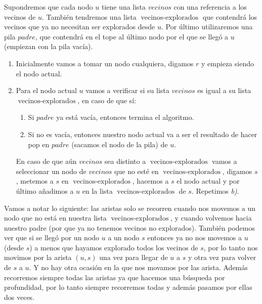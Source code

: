 \documentclass[11pt,letterpaper]{article}
\begin{document}
\begin{enumerate}[leftmargin=*]
    Supondremos que cada nodo $u$ tiene una lista $vecinos$ con una referencia a los vecinos de $u$.
    También tendremos una lista $\operatorname{vecinos-explorados}$ que contendrá los vecinos que ya no necesitan ser explorados desde $u$.
    Por último utilizaremos una pila $padre$, que contendrá en el tope al último nodo por el que se llegó a $u$ (empiezan con la pila vacía).

    \begin{enumerate}
      \item Inicialmente vamos a tomar un nodo cualquiera, digamos $r$ y empieza siendo el nodo actual.
    
      \item Para el nodo actual $u$ vamos a verificar si su lista $vecinos$ es igual a su lista $\operatorname{vecinos-explorados}$, en caso de que sí:
      \begin{enumerate}[label=\alph*)]
        \item Si $padre$ ya está vacía, entonces termina el algoritmo. 
        \item Si no es vacía, entonces nuestro nodo actual va a ser el resultado de hacer pop en $padre$ (sacamos el nodo de la pila) de $u$.
      \end{enumerate}

      En caso de que aún $vecinos$ sea distinto a $\operatorname{vecinos-explorados}$ vamos a seleccionar un nodo de $vecinos$ que no esté en $\operatorname{vecinos-explorados}$, digamos $s$, metemos a $s$ en $\operatorname{vecinos-explorados}$, hacemos a $s$ el nodo actual y por último añadimos a $u$ en la lista $\operatorname{vecinos-explorados}$ de $s$.
      Repetimos \textit{b)}.
    \end{enumerate}
    
    Vamos a notar lo siguiente: las aristas solo se recorren cuando nos movemos a un nodo que no está en nuestra lista $\operatorname{vecinos-explorados}$, y cuando volvemos hacia nuestro padre (por que ya no tenemos vecinos no explorados).
    También podemos ver que si se llegó por un nodo $u$ a un nodo $s$ entonces ya no nos movemos a $u$ (desde $s$) a menos que hayamos explorado todos los vecinos de $s$, por lo tanto nos movimos por la arista $(u,s)$ una vez para llegar de $u$ a $s$ y otra vez para volver de $s$ a $u$.
    Y no hay otra ocasión en la que nos movamos por las arista. 
    Además recorremos siempre todas las aristas ya que hacemos una búsqueda por profundidad, por lo tanto siempre recorremos todas y además pasamos por ellas dos veces.
    

\end{enumerate}
\end{document}
